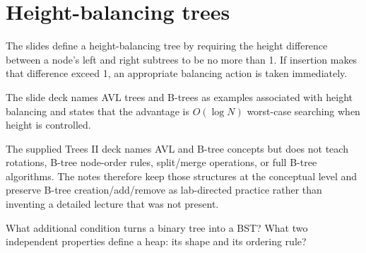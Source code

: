 \section{Height-balancing trees}

The slides define a height-balancing tree by requiring the height difference between a node's left and right subtrees to be no more than 1. If insertion makes that difference exceed 1, an appropriate balancing action is taken immediately.

\begin{utpfigure}
\end{utpfigure}

The slide deck names AVL trees and B-trees as examples associated with height balancing and states that the advantage is $O(\log N)$ worst-case searching when height is controlled.

\begin{clarification}
The supplied Trees II deck names AVL and B-tree concepts but does not teach rotations, B-tree node-order rules, split/merge operations, or full B-tree algorithms. The notes therefore keep those structures at the conceptual level and preserve B-tree creation/add/remove as lab-directed practice rather than inventing a detailed lecture that was not present.
\end{clarification}

\begin{quickcheck}
What additional condition turns a binary tree into a BST? What two independent properties define a heap: its shape and its ordering rule?
\end{quickcheck}


